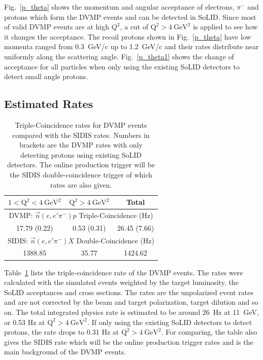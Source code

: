 Fig.~\ref{p_theta} shows the momentum and angular acceptance of electrons, $\pi^{-}$ and protons which form the DVMP events and can be detected in SoLID. Since most of valid DVMP events are at high $Q^{2}$, a cut of $\mathrm{Q^{2}>4~GeV^{2}}$ is applied to see how it changes the acceptance. The recoil protons shown in Fig.~\ref{p_theta}  have low momenta ranged from 0.3~GeV/c up to 1.2~GeV/c and their rates distribute near uniformly along the scattering angle. Fig.~\ref{p_theta1} shows the change of acceptance for all particles when only using the existing SoLID detectors to detect small angle protons.

\subsection{Estimated Rates}
\begin{table}[!ht]
\centering
\begin{tabular}{|c|c|c|}
 \hline
  $\mathrm{1<Q^{2}<4~GeV^{2}}$             &    $\mathrm{Q^{2}>4~GeV^{2}}$  & Total\\
 \hline
                  \multicolumn{3}{|c|}{DVMP: $\vec{n}(e,e'\pi^{-})p$ Triple-Coincidence (Hz)}     \\
 \hline
 17.79 (0.22)   &  0.53 (0.31) & 26.45 (7.66)   \\
 \hline
                  \multicolumn{3}{|c|}{SIDIS: $\vec{n}(e,e'\pi^{-})X$ Double-Coincidence (Hz)}                                     \\
 \hline
1388.85 & 35.77 & 1424.62   \\
 \hline
\end{tabular}
\caption[Triple-Coincidence rates for neutron-DVMP]{\footnotesize{Triple-Coincidence  rates for DVMP events compared with the SIDIS rates. Numbers in brackets are the DVMP rates with only detecting protons using existing SoLID detectors. The online production trigger will be the SIDIS double-coincidence trigger of which rates are also given.}}
\label{rate_table}
\end{table} 
Table~\ref{rate_table} lists the triple-coincidence rate of the DVMP events. The rates were calculated with the simulated events weighted by the target luminosity, the SoLID acceptances and cross sections. The rates are the unpolarized event rates and are not corrected by the beam and target polarization, target dilution and so on. The total integrated physics rate is estimated to be around 26~Hz  at 11~GeV, or  0.53 Hz at $\mathrm{Q^{2}>4~GeV^{2}}$. If only using the existing SoLID detectors to detect protons, the rate drops to 0.31 Hz at $\mathrm{Q^{2}>4~GeV^{2}}$.  For comparing,  the table also gives the SIDIS rate  which will be the online production trigger rates and is the main background of the DVMP events. 


